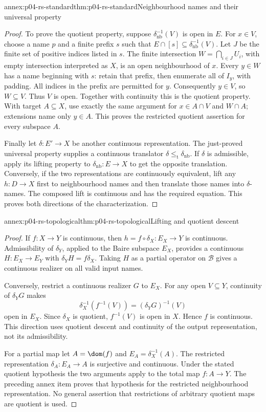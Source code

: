\begin{annexitem}{annex:p04-rs-standard}{thm:p04-rs-standard}{Neighbourhood names and their universal property}
\begin{proof}
To prove the quotient property, suppose
\(\delta_{\mathrm{nb}}^{-1}(V)\) is open in \(E\).
For \(x\in V\), choose a name \(p\) and a finite prefix \(s\)
such that \(E\cap[s]\subseteq\delta_{\mathrm{nb}}^{-1}(V)\).
Let \(J\) be the finite set of positive indices listed in \(s\).
The finite intersection \(W=\bigcap_{i\in J}U_i\), with empty
intersection interpreted as \(X\), is an open neighbourhood
of \(x\). Every \(y\in W\) has a name beginning with \(s\):
retain that prefix, then enumerate all of \(I_y\), with padding.
All indices in the prefix are permitted for \(y\).
Consequently \(y\in V\), so \(W\subseteq V\).
Thus \(V\) is open. Together with continuity this is the
quotient property. With target \(A\subseteq X\), use exactly
the same argument for \(x\in A\cap V\) and \(W\cap A\);
extensions name only \(y\in A\). This proves the restricted
quotient assertion for every subspace \(A\).

Finally let \(\delta:E'\to X\) be another continuous
representation. The just-proved universal property supplies a
continuous translator \(\delta\leq_{\mathrm t}\delta_{\mathrm{nb}}\).
If \(\delta\) is admissible, apply its lifting property to
\(\delta_{\mathrm{nb}}:E\to X\) to get the opposite translation.
Conversely, if the two representations are continuously
equivalent, lift any \(h:D\to X\) first to neighbourhood names
and then translate those names into \(\delta\)-names.
The composed lift is continuous and has the required equation.
This proves both directions of the characterization.
\end{proof}
\end{annexitem}

\begin{annexitem}{annex:p04-rs-topological}{thm:p04-rs-topological}{Lifting and quotient descent}
\begin{proof}
If \(f:X\to Y\) is continuous, then
\(h=f\circ\delta_X:E_X\to Y\) is continuous.
Admissibility of \(\delta_Y\), applied to the Baire subspace
\(E_X\), provides a continuous \(H:E_X\to E_Y\) with
\(\delta_YH=f\delta_X\).
Taking \(H\) as a partial operator on \(\mathcal B\) gives
a continuous realizer on all valid input names.

Conversely, restrict a continuous realizer \(G\) to \(E_X\).
For any open \(V\subseteq Y\), continuity of \(\delta_YG\)
makes
\[
 \delta_X^{-1}(f^{-1}(V))
 =(\delta_YG)^{-1}(V)
\]
open in \(E_X\). Since \(\delta_X\) is quotient,
\(f^{-1}(V)\) is open in \(X\). Hence \(f\) is continuous.
This direction uses quotient descent and continuity of the
output representation, not its admissibility.

For a partial map let \(A=\dom(f)\) and
\(E_A=\delta_X^{-1}(A)\). The restricted representation
\(\delta_A:E_A\to A\) is surjective and continuous.
Under the stated quotient hypothesis the two arguments apply
to the total map \(f:A\to Y\). The preceding annex item proves
that hypothesis for the restricted neighbourhood representation.
No general assertion that restrictions of arbitrary quotient
maps are quotient is used.
\end{proof}
\end{annexitem}

